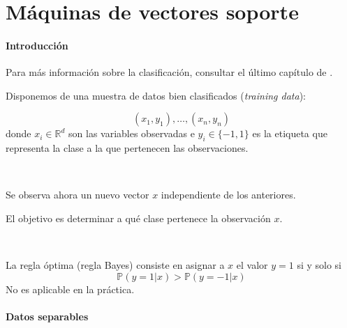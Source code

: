 \section{Máquinas de vectores soporte}

\paragraph{Introducción}

Para más información sobre la clasificación, consultar el último capítulo de \citep{ApuntesEstII}.
%

Disponemos de una muestra de datos bien clasificados (\textit{training data}):

\[
(x_1,y_1),\ldots, (x_n,y_n)
\]
donde $x_i\in \mathbb{R}^d$ son las variables observadas e $y_i\in\{-1,1\}$ es la etiqueta que representa la clase a la que pertenecen las observaciones.

\

Se observa ahora un nuevo vector $x$ independiente de los anteriores.

El objetivo es determinar a qué clase pertenece la observación $x$.

\

La regla óptima (regla Bayes) consiste en asignar a $x$ el valor $y=1$ si y solo si
\[
\mathbb{P}(y=1| x) > \mathbb{P}(y=-1|x)
\]
No es aplicable en la práctica.


\paragraph{Datos separables}

